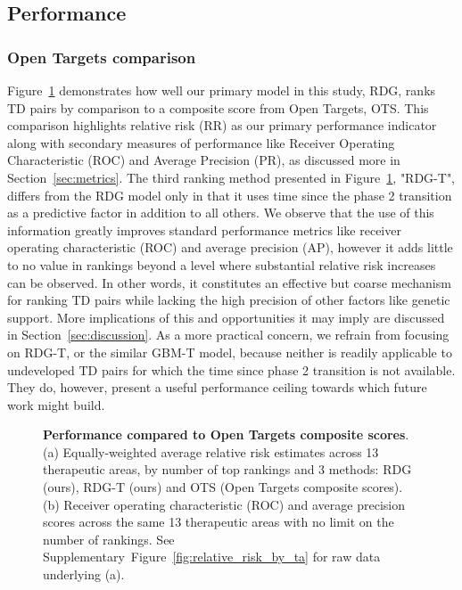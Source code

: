 \documentclass{article}
\begin{document}
\subsection{Performance}
\label{sec:results_performance}

\subsubsection{Open Targets comparison}

Figure~\ref{fig:performance_across_ta} demonstrates how well our primary model in this study, RDG, ranks TD pairs by comparison to a composite score from Open Targets, OTS. This comparison highlights relative risk (RR) as our primary performance indicator along with secondary measures of performance like Receiver Operating Characteristic (ROC) and Average Precision (PR), as discussed more in Section~\ref{sec:metrics}. The third ranking method presented in Figure~\ref{fig:performance_across_ta}, "RDG-T", differs from the RDG model only in that it uses time since the phase 2 transition as a predictive factor in addition to all others. We observe that the use of this information greatly improves standard performance metrics like receiver operating characteristic (ROC) and average precision (AP), however it adds little to no value in rankings beyond a level where substantial relative risk increases can be observed. In other words, it constitutes an effective but coarse mechanism for ranking TD pairs while lacking the high precision of other factors like genetic support. More implications of this and opportunities it may imply are discussed in Section~\ref{sec:discussion}. As a more practical concern, we refrain from focusing on RDG-T, or the similar GBM-T model, because neither is readily applicable to undeveloped TD pairs for which the time since phase 2 transition is not available. They do, however, present a useful performance ceiling towards which future work might build.

\begin{figure}[!htb]
  \centering
  \captionsetup{width=.9\linewidth}
  \captionsetup[subfigure]{labelformat=empty}
  \qquad
  \caption{
    \textbf{Performance compared to Open Targets composite scores}.
    (a) Equally-weighted average relative risk estimates across 13 therapeutic areas, by number of top rankings and 3 methods: RDG (ours), RDG-T (ours) and OTS (Open Targets composite scores). 
    (b) Receiver operating characteristic (ROC) and average precision scores across the same 13 therapeutic areas with no limit on the number of rankings. 
    See Supplementary~Figure~\ref{fig:relative_risk_by_ta} for raw data underlying (a).
  }
  \label{fig:performance_across_ta}
\end{figure}
\end{document}
